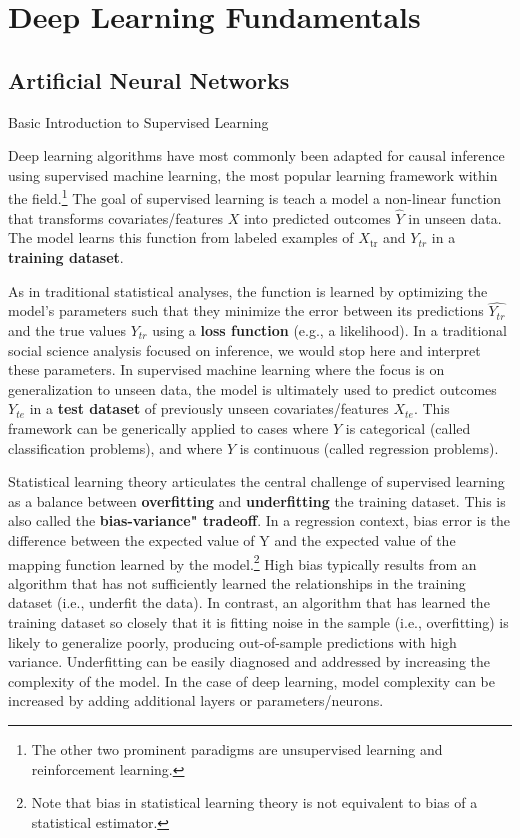 \section{Deep Learning Fundamentals}
\label{section:primerdl}

\subsection{Artificial Neural Networks}

\begin{TCBBox}[label=Box:supervisedlearning]{Basic Introduction to Supervised Learning}

Deep learning algorithms have most commonly been adapted for causal inference using supervised machine learning, the most popular learning framework within the field.\footnote{The other two prominent paradigms are unsupervised learning and reinforcement learning.} The goal of supervised learning is teach a model a non-linear function that transforms covariates/features $X$ into predicted outcomes $\hat{Y}$ in unseen data. The model learns this function from labeled examples of $X_\text{tr}$ and $Y_{tr}$ in a \textbf{training dataset}.

As in traditional statistical analyses, the function is learned by optimizing the model's parameters such that they minimize the error between its predictions $\hat{Y_{tr}}$ and the true values $Y_{tr}$ using a \textbf{loss function} (e.g., a likelihood). In a traditional social science analysis focused on inference, we would stop here and interpret these parameters. In supervised machine learning where the focus is on generalization to unseen data, the model is ultimately used to predict outcomes $Y_{te}$ in a \textbf{test dataset} of previously unseen covariates/features $X_{te}$. This framework can be generically applied to cases where $Y$ is categorical (called classification problems), and where $Y$ is continuous (called regression problems).

Statistical learning theory articulates the central challenge of supervised learning as a balance between \textbf{overfitting} and \textbf{underfitting} the training dataset. This is also called the \textbf{bias-variance" tradeoff}. In a regression context, bias error is the difference between the expected value of Y and the expected value of the mapping function learned by the model.\footnote{Note that bias in statistical learning theory is not equivalent to bias of a statistical estimator.} High bias typically results from an algorithm that has not sufficiently learned the relationships in the training dataset (i.e., underfit the data). In contrast, an algorithm that has learned the training dataset so closely that it is fitting noise in the sample (i.e., overfitting) is likely to generalize poorly, producing out-of-sample predictions with high variance. Underfitting can be easily diagnosed and addressed by increasing the complexity of the model. In the case of deep learning, model complexity can be increased by adding additional layers or parameters/neurons.


\end{TCBBox}
